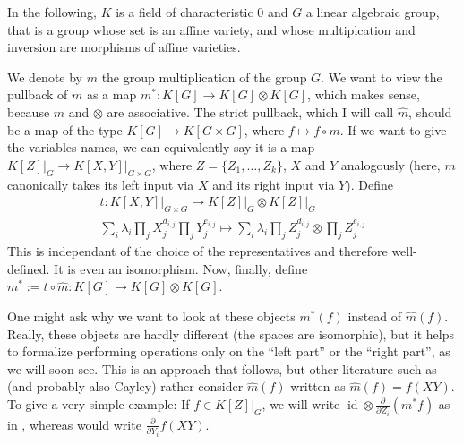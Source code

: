 In the following, $K$ is a field of characteristic $0$ and $G$ a linear algebraic group, that is a group whose set is an affine variety, and whose multiplcation and inversion are morphisms of affine varieties.

\begin{definition}
We denote by $m$ the group multiplication of the group $G$.
We want to view the pullback of $m$ as a map $m^\ast : K[G] \longrightarrow K[G] \otimes K[G]$, which makes sense, because $m$ and $\otimes$ are associative.
The strict pullback, which I will call $ \hat{m} $, should be a map of the type $ K[G] \longrightarrow K[ G \times G] $, where $ f \mapsto f \circ m $.
If we want to give the variables names, we can equivalently say it is a map $ \left. K[Z] \right|_G \longrightarrow \left. K[X,Y] \right|_{G \times G} $, where $ Z = \lbrace Z_1 , \ldots , Z_k \rbrace $, $X$ and $Y$ analogously (here, $ m $ canonically takes its left input via $ X $ and its right input via $ Y $).
Define
\begin{equation}
  \begin{aligned}
   t \colon \left. K \left\lbrack X , Y \right\rbrack \right|_{G \times G} \longrightarrow \left. K \left\lbrack Z \right\rbrack \right|_G \otimes \left. K\left\lbrack Z \right\rbrack \right|_G \\
    \sum_i \lambda_i \prod_j X_{j}^{d_{i,j}} \prod_j Y_{j}^{e_{i,j}} \mapsto \sum_i \lambda_i \prod_j Z_{j}^{d_{i,j}} \otimes \prod_j Z_{j}^{e_{i,j}} 
  \end{aligned}
\end{equation}
This is independant of the choice of the representatives and therefore well-defined.
It is even an isomorphism.
Now, finally, define $m^\ast := t \circ \hat{m} : K[G] \longrightarrow K[G] \otimes K[G]$.
\end{definition}

\begin{remark}
One might ask why we want to look at these objects $ m^\ast \left( f \right) $ instead of $ \hat{m} \left( f \right) $.
Really, these objects are hardly different (the spaces are isomorphic), but it helps to formalize performing operations only on the ``left part'' or the ``right part'', as we will soon see.
This is an approach that \cite{DK15} follows, but other literature such as \cite{Stu08} (and probably also Cayley) rather consider $ \hat{m} \left( f \right) $ written as $ \hat{m} \left( f \right) = f (XY) $.
To give a very simple example:
If $f \in \left. K[Z] \right|_G$, we will write $\operatorname{id} \otimes \frac{\partial}{\partial Z_i} (m^\ast f)$ as in \cite{DK15}, whereas \cite{Stu08} would write $\frac{\partial}{\partial Y_i} f(XY)$.
\end{remark}


